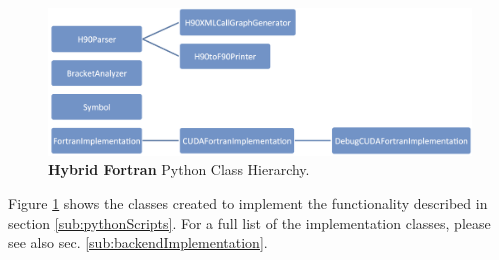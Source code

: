 \begin{figure}[htpb]
	\centering
	\includegraphics[width=14cm]{figures/classHierarchy}
	\caption[Hybrid Fortran Python Class Hierarchy]{\textbf{Hybrid Fortran} Python Class Hierarchy.}
	\label{figure:classHierarchy}
\end{figure}

Figure \ref{figure:classHierarchy} shows the classes created to implement the functionality described in section \ref{sub:pythonScripts}. For a full list of the implementation classes, please see also sec. \ref{sub:backendImplementation}.

